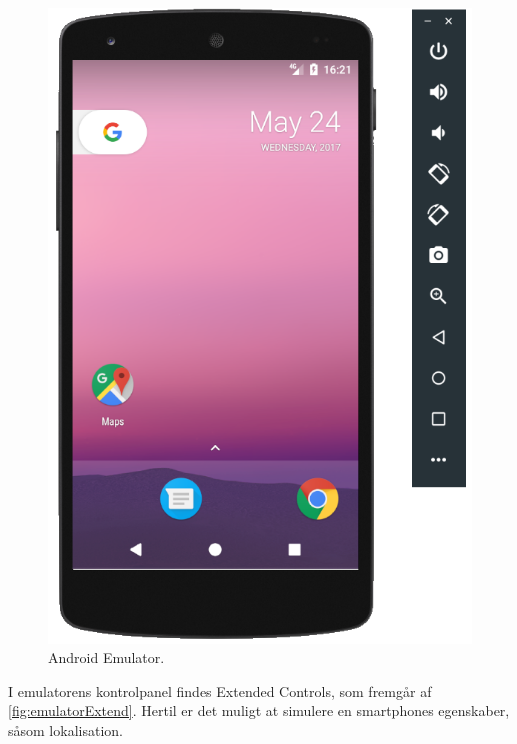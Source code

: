 \begin{figure} [H]
\centering
\includegraphics[width=1\textwidth]{figures/emulator}
\caption{Android Emulator.}
\label{fig:androidEmulator}
\end{figure}

\noindent
I emulatorens kontrolpanel findes Extended Controls, som fremgår af \autoref{fig:emulatorExtend}. Hertil er det muligt at simulere en smartphones egenskaber, såsom lokalisation.

